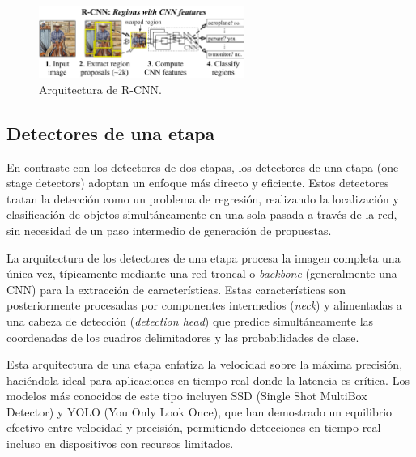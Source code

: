 \documentclass[11pt,spanish,listoffigures,listoftables]{tfgetsinf}
\begin{document}
\begin{figure}[H]
   \centering
   \includegraphics[width=0.6\textwidth]{images/estado_del_arte/R-CNN.png}
   \caption{Arquitectura de R-CNN.}
   \label{fig:r-cnn}
\end{figure}

\subsection{Detectores de una etapa}

En contraste con los detectores de dos etapas, los detectores de una etapa (one-stage detectors) adoptan un enfoque más directo y eficiente. Estos detectores tratan la detección como un problema de regresión, realizando la localización y clasificación de objetos simultáneamente en una sola pasada a través de la red, sin necesidad de un paso intermedio de generación de propuestas.

La arquitectura de los detectores de una etapa procesa la imagen completa una única vez, típicamente mediante una red troncal o \textit{backbone} (generalmente una CNN) para la extracción de características. Estas características son posteriormente procesadas por componentes intermedios (\textit{neck}) y alimentadas a una cabeza de detección (\textit{detection head}) que predice simultáneamente las coordenadas de los cuadros delimitadores y las probabilidades de clase. 

Esta arquitectura de una etapa enfatiza la velocidad sobre la máxima precisión, haciéndola ideal para aplicaciones en tiempo real donde la latencia es crítica. Los modelos más conocidos de este tipo incluyen SSD (Single Shot MultiBox Detector)\cite{Liu_2016} y YOLO (You Only Look Once)\cite{redmon2016lookonceunifiedrealtime}, que han demostrado un equilibrio efectivo entre velocidad y precisión, permitiendo detecciones en tiempo real incluso en dispositivos con recursos limitados.
\end{document}
